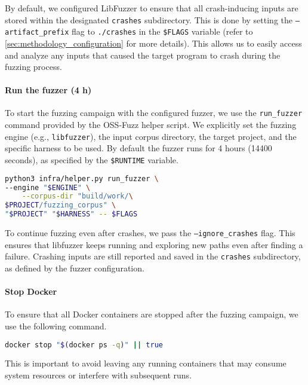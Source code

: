 By default, we configured LibFuzzer to ensure that all crash-inducing inputs are stored within the designated \texttt{crashes} subdirectory. This is done by setting the \texttt{---artifact\_prefix} flag to \texttt{./crashes} in the \texttt{\$FLAGS} variable (refer to \autoref{sec:methodology_configuration} for more details). This allows us to easily access and analyze any inputs that caused the target program to crash during the fuzzing process.

\noindent \paragraph{Run the fuzzer (4 h)}

To start the fuzzing campaign with the configured fuzzer, we use the \texttt{run\_fuzzer} command provided by the OSS-Fuzz helper script. We explicitly set the fuzzing engine (e.g., \texttt{libfuzzer}), the input corpus directory, the target project, and the specific harness to be used. By default the fuzzer runs for 4 hours (14400 seconds), as specified by the \texttt{\$RUNTIME} variable.

\begin{lstlisting}[language=bash, caption=Bash command to run a single fuzzing campaign leveraging OSS-Fuzz helper script]
python3 infra/helper.py run_fuzzer \
--engine "$ENGINE" \
	--corpus-dir "build/work/\
$PROJECT/fuzzing_corpus" \
"$PROJECT" "$HARNESS" -- $FLAGS
\end{lstlisting}

To continue fuzzing even after crashes, we pass the \texttt{--ignore\_crashes} flag. This ensures that libfuzzer keeps running and exploring new paths even after finding a failure. Crashing inputs are still reported and saved in the \texttt{crashes} subdirectory, as defined by the fuzzer configuration.

\noindent \paragraph{Stop Docker}

To ensure that all Docker containers are stopped after the fuzzing campaign, we use the following command.

\begin{lstlisting}[language=bash, caption=Bash command to stop all running Docker containers]
docker stop "$(docker ps -q)" || true
\end{lstlisting}

This is important to avoid leaving any running containers that may consume system resources or interfere with subsequent runs.


